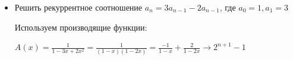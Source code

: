 \documentclass[12pt]{article}
\begin{document}
\begin{itemize}
        $T(n) = f(n) + \sum_{i = 1}^k a_i T(b_i n + h_i(n)) \Longrightarrow T(n) \in \Theta\left(n^p \cdot \left(1 + \int_1^n \frac{f(x)}{x^{p + 1}} dx\right)\right)$, где $p$ -- решение для $\sum_{i = 1}^k a_i b_i^p = 1$

        $\begin{cases}
            k = const \\
            a_i > 0 \\
            0 < b_i < 1 \\
            h_1(n) \in O\left(\frac{n}{\log^2 n}\right) \text{ -- малые возмущения}
        \end{cases}$

        \Ex $T(n) = T\left(\left\lfloor\frac{n}{2}\right\rfloor\right) + T\left(\left\lceil\frac{n}{2}\right\rceil\right) + n$ -- асимптотика сортировки слиянием

        $T(n) = T\left(\frac{n}{2} + O(1)\right) + T\left(\frac{n}{2} - O(1)\right) + \theta(n)$

        Здесь $b_i = \frac{1}{2}, \quad h = \pm O(1) \in O\left(\frac{n}{\log^2 n}\right)$

        \Ex $T(n) = T\left(\frac{3n}{4}\right) + T\left(\frac{n}{4}\right) + n$

        $a_1 = 1, b_1 = \frac{3}{4}, a_2 = 1, b_2 = \frac{1}{4}, f(n) = n$

        $\left(\frac{3}{4}\right)^p + \left(\frac{1}{4}\right)^p = 1$

        $p = 1$

        $\int_1^n \frac{x}{x^{1 + 1}}dx = \int_1^n \frac{dx}{x} = \ln x \Big|_1^n = \ln n$

        $T(n) \in \Theta(n \cdot (1 + \ln n))$

        $T(n) \in \Theta(n \ln n)$

        \item Решить рекуррентное соотношение $a_n = 3a_{n-1} - 2a_{n-1}$, где $a_0 = 1, a_1 = 3$

        Используем производящие функции:

        $A(x) = \frac{1}{1 - 3x + 2x^2} = \frac{1}{(1 - x)(1 - 2x)} = \frac{-1}{1 - x} + \frac{2}{1 - 2x} \to 2^{n + 1} - 1$

    \end{itemize}
\end{document}
